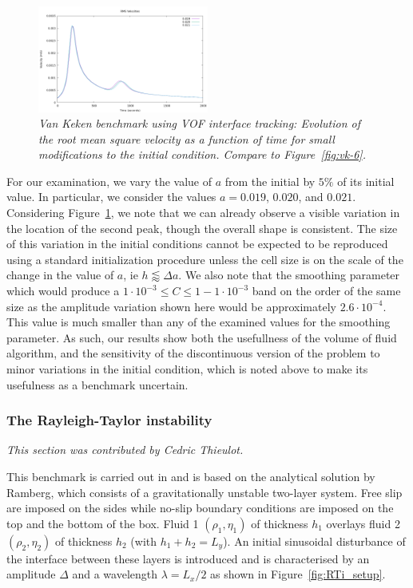 \documentclass{article}
\begin{document}
\begin{figure}[htb]
    \centering
    \includegraphics[width=0.5\textwidth]{cookbooks/benchmarks/vof-van-keken/init_diff_rms_vel_comparison.png}
    \caption{\it Van Keken benchmark using VOF interface tracking: Evolution of
        the root mean square velocity as a function of time for small modifications
    to the initial condition.  Compare to Figure~\ref{fig:vk-6}.}
    \label{fig:vof-vk-3}
\end{figure}

For our examination, we vary the value of $a$ from the initial by $5\%$ of its initial value.
In particular, we consider the values $a=0.019$, $0.020$, and $0.021$.
Considering Figure~\ref{fig:vof-vk-3}, we note that we can already observe a
visible variation in the location of the second peak, though the overall shape
is consistent.
The size of this variation in the initial conditions cannot be expected to be
reproduced using a standard initialization procedure unless the cell size is on
the scale of the change in the value of $a$, ie $h\lessapprox \Delta a$.
We also note that the smoothing parameter which would produce a
$1\cdot10^{-3}\leq C\leq 1-1\cdot10^{-3}$ band on the order of the same size as
the amplitude variation shown here would be approximately $2.6\cdot10^{-4}$.
This value is much smaller than any of the examined values for the smoothing
parameter.
As such, our results show both the usefullness of the volume of fluid
algorithm, and the sensitivity of the discontinuous version of the problem to
minor variations in the initial condition, which is noted above to make its
usefulness as a benchmark uncertain.

\subsubsection{The Rayleigh-Taylor instability}
\label{sec:benchmark-rayleigh-taylor}

\textit{This section was contributed by Cedric Thieulot.}

This benchmark is carried out in \cite{Deu08,Ger10,thie11} and is 
based on the analytical solution by Ramberg\cite{ramb68}, 
which  consists of a gravitationally unstable two-layer system.
Free slip are imposed on the sides while no-slip boundary conditions are imposed on the
top and the bottom of the box.
Fluid 1 $(\rho_1,\eta_1)$ of thickness $h_1$ overlays 
fluid 2 $(\rho_2,\eta_2)$ of thickness $h_2$ (with $h_1+h_2=L_y$).
An initial sinusoidal disturbance of the interface between these
layers is introduced and is characterised by an amplitude $\Delta$ and a
wavelength $\lambda=L_x/2$ as shown in Figure~\ref{fig:RTi_setup}.
\end{document}
